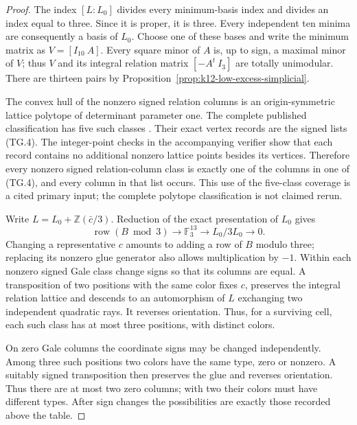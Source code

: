 \documentclass[11pt,a4paper]{article}
\theoremstyle{definition}
\begin{document}
\begin{proof}
The index $[L:L_0]$ divides every minimum-basis index and divides an
index equal to three. Since it is proper, it is three. Every independent
ten minima are consequently a basis of $L_0$. Choose one of these
bases and write the minimum matrix as $V=[I_{10}\ A]$.
Every square minor of $A$ is, up to sign, a maximal minor of $V$;
thus $V$ and its integral relation matrix $[-A^t\ I_3]$ are totally
unimodular. There are thirteen pairs by
Proposition~\ref{prop:k12-low-excess-simplicial}.

The convex hull of the nonzero signed relation columns is an
origin-symmetric lattice polytope of determinant parameter one.
The complete published classification has five such classes
\cite[\S5.2, Table~2, p.~85]{AverkovSchymura2024}.
Their exact vertex records are the signed lists (TG.4).
The integer-point checks in the accompanying verifier show that each
record contains no additional nonzero lattice points besides its
vertices. Therefore every nonzero signed relation-column class is
exactly one of the columns in one of (TG.4), and every column in that
list occurs. This use of the five-class coverage is a cited primary
input; the complete polytope classification is not claimed rerun.

Write $L=L_0+\mathbb Z(\bar c/3)$. Reduction of the exact presentation
of $L_0$ gives
\[
 \operatorname{row}(B\bmod3)\longrightarrow\mathbb F_3^{13}
      \longrightarrow L_0/3L_0\longrightarrow0.                 \tag{TG.6}
\]
Changing a representative $c$ amounts to adding a row of $B$ modulo
three; replacing its nonzero glue generator also allows multiplication
by $-1$.
Within each nonzero signed Gale class change signs so that its
columns are equal. A transposition of two positions with the same
color fixes $c$, preserves the integral relation lattice and descends
to an automorphism of $L$ exchanging two independent quadratic rays.
It reverses orientation. Thus, for a surviving cell, each such class
has at most three positions, with distinct colors.

On zero Gale columns the coordinate signs may be changed independently.
Among three such positions two colors have the same type, zero or
nonzero. A suitably signed transposition then preserves the glue and
reverses orientation. Thus there are at most two zero columns; with
two their colors must have different types. After sign changes the
possibilities are exactly those recorded above the table.


\end{proof}
\end{document}
